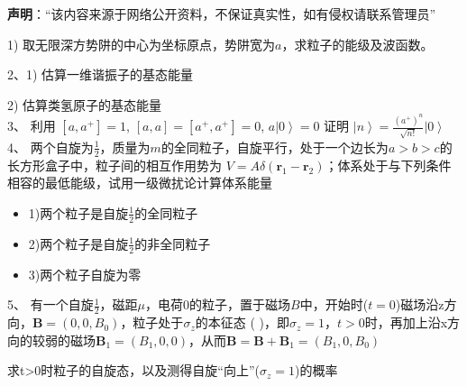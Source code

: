 
\textbf{声明}：“该内容来源于网络公开资料，不保证真实性，如有侵权请联系管理员”


1) 取无限深方势阱的中心为坐标原点，势阱宽为$a$，求粒子的能级及波函数。

2、1) 估算一维谐振子的基态能量

2) 估算类氢原子的基态能量\\

3、 利用 $[a,a^+]=1$, \quad $[a,a]=[a^+,a^+]=0$, \quad $a \left| 0 \right\rangle =0$ 证明 $\left| n \right\rangle = \frac{(a^+)^n}{\sqrt{n!}} \left| 0 \right\rangle$\\

4、 两个自旋为$\frac{1}{2}$，质量为$m$的全同粒子，自旋平行，处于一个边长为$a>b>c$的长方形盒子中，粒子间的相互作用势为 $V=A\delta (\mathbf{r}_1 - \mathbf{r}_2)$；体系处于与下列条件相容的最低能级，试用一级微扰论计算体系能量

\begin{itemize}
    \item 1)两个粒子是自旋$\frac{1}{2}$的全同粒子
    \item 2)两个粒子是自旋$\frac{1}{2}$的非全同粒子
    \item 3)两个粒子自旋为零
\end{itemize}

5、 有一个自旋$\frac{1}{2}$，磁距$\mu$，电荷0的粒子，置于磁场$B$中，开始时($t=0$)磁场沿z方向，$\mathbf{B}= \left( 0, 0, B_0 \right)$，粒子处于$\sigma_z$的本征态 (  )，即$\sigma_z = 1$，$t>0$时，再加上沿x方向的较弱的磁场$\mathbf{B}_1 = \left( B_1, 0, 0 \right)$，从而$\mathbf{B} = \mathbf{B} + \mathbf{B}_1 = \left( B_1, 0, B_0 \right)$

求t>0时粒子的自旋态，以及测得自旋“向上”($\sigma_z=1$)的概率

